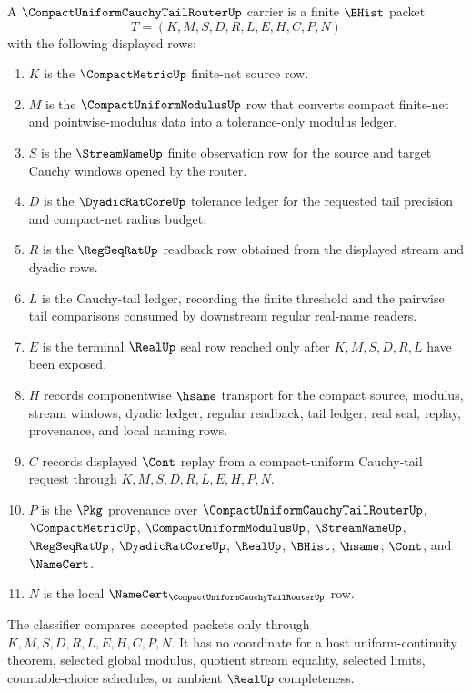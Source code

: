 \begin{definition}
\label{def:compact-uniform-cauchy-tail-router-carrier}
A $\CompactUniformCauchyTailRouterUp$ carrier is a finite $\BHist$ packet
$$
T=(K,M,S,D,R,L,E,H,C,P,N)
$$
with the following displayed rows:
\begin{enumerate}
\item $K$ is the $\CompactMetricUp$ finite-net source row.
\item $M$ is the $\CompactUniformModulusUp$ row that converts compact finite-net and pointwise-modulus data into a tolerance-only modulus ledger.
\item $S$ is the $\StreamNameUp$ finite observation row for the source and target Cauchy windows opened by the router.
\item $D$ is the $\DyadicRatCoreUp$ tolerance ledger for the requested tail precision and compact-net radius budget.
\item $R$ is the $\RegSeqRatUp$ readback row obtained from the displayed stream and dyadic rows.
\item $L$ is the Cauchy-tail ledger, recording the finite threshold and the pairwise tail comparisons consumed by downstream regular real-name readers.
\item $E$ is the terminal $\RealUp$ seal row reached only after $K,M,S,D,R,L$ have been exposed.
\item $H$ records componentwise $\hsame$ transport for the compact source, modulus, stream windows, dyadic ledger, regular readback, tail ledger, real seal, replay, provenance, and local naming rows.
\item $C$ records displayed $\Cont$ replay from a compact-uniform Cauchy-tail request through $K,M,S,D,R,L,E,H,P,N$.
\item $P$ is the $\Pkg$ provenance over $\CompactUniformCauchyTailRouterUp$, $\CompactMetricUp$, $\CompactUniformModulusUp$, $\StreamNameUp$, $\RegSeqRatUp$, $\DyadicRatCoreUp$, $\RealUp$, $\BHist$, $\hsame$, $\Cont$, and $\NameCert$.
\item $N$ is the local $\NameCert_{\CompactUniformCauchyTailRouterUp}$ row.
\end{enumerate}
The classifier compares accepted packets only through $K,M,S,D,R,L,E,H,C,P,N$. It has no coordinate for a host uniform-continuity theorem, selected global modulus, quotient stream equality, selected limits, countable-choice schedules, or ambient $\RealUp$ completeness.
\end{definition}

